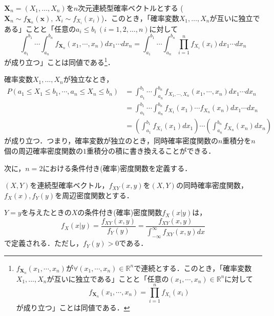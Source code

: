 \documentclass{jsreport}
\begin{document}
$\bm{X}_n = (X_1, \ldots, X_n)$を$n$次元連続型確率ベクトルとする ($\bm{X}_n \sim f_{\bm{X}_n}(\bm{x}), \, X_i \sim f_{X_i}(x_i)$)．このとき，「確率変数$X_1, \ldots, X_n$が互いに独立である」ことと「任意の$a_i \leq b_i \, (i = 1, 2, \ldots, n)$に対して
\begin{equation}
  \int_{a_1}^{b_1} \cdots \int_{a_n}^{b_n} f_{\bm{X}_n}(x_1, \cdots, x_n) dx_1 \cdots dx_n = \int_{a_1}^{b_1} \cdots \int_{a_n}^{b_n} \prod_{i = 1}^n f_{X_i}(x_i) dx_1 \cdots dx_n \nonumber
\end{equation}
が成り立つ」ことは同値である\footnote{
$f_{\bm{X}_n}(x_1, \cdots, x_n)$が$\forall (x_1, \cdots, x_n) \in \mathbb{R}^n$で連続とする．このとき，「確率変数$X_1, \ldots, X_n$が互いに独立である」ことと「任意の$(x_1, \cdots, x_n) \in \mathbb{R}^n$に対して
\begin{equation}
  f_{\bm{X}_n}(x_1, \cdots, x_n) = \prod_{i = 1}^n f_{X_i}(x_i) \nonumber
\end{equation}
が成り立つ」ことは同値である．
}．

確率変数$X_1, \ldots, X_n$が独立なとき，
\begin{align}
  P(a_1 \leq X_1 \leq b_1, \cdots, a_n \leq X_n \leq b_n) &= \int_{a_1}^{b_1} \cdots \int_{a_n}^{b_n} f_{X_1, \cdots, X_n}(x_1, \cdots, x_n) dx_1 \cdots dx_n \nonumber \\
  &= \int_{a_1}^{b_1} \cdots \int_{a_n}^{b_n} f_{X_1}(x_1) \cdots f_{X_n}(x_n) dx_1 \cdots dx_n \nonumber \\
  &= \left(\int_{a_1}^{b_1} f_{X_1}(x_1) dx_1\right) \cdots \left(\int_{a_n}^{b_n} f_{X_n}(x_n) dx_n\right) \nonumber
\end{align}
が成り立つ．つまり，確率変数が独立のとき，同時確率密度関数の$n$重積分を$n$個の周辺確率密度関数の$1$重積分の積に書き換えることができる．

次に，$n = 2$における条件付き(確率)密度関数を定義する．
\begin{screen}
  \begin{defi}[条件付き密度関数]
    $(X, Y)$を連続型確率ベクトル，$f_{XY}(x, y)$を$(X, Y)$の同時確率密度関数，$f_{X}(x), f_{Y}(y)$を周辺密度関数とする．

    $Y = y$を与えたときの$X$の条件付き(確率)密度関数$f_{X}(x|y)$は，
    \begin{equation}
      f_{X}(x|y) = \frac{f_{XY}(x, y)}{f_{Y}(y)} = \frac{f_{XY}(x, y)}{\int_{-\infty}^{\infty} f_{XY} (x, y)dx} \nonumber
    \end{equation}
    で定義される．ただし，$f_{Y}(y) > 0$である．
  \end{defi}
\end{screen}
\end{document}
